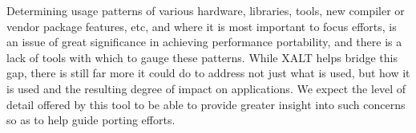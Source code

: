 Determining usage patterns of various hardware, libraries, tools, new compiler or vendor package features, 
etc, and where it is most important to focus efforts, is an issue of great significance in achieving performance 
portability, and there is a lack of tools with which to gauge these patterns.
While XALT helps bridge this gap, there is still far more it could do to address not just what is used, but how it 
is used and the resulting degree of impact on applications.
We expect the level of detail offered by this tool to be able to provide greater insight into such concerns so as 
to help guide porting efforts.





